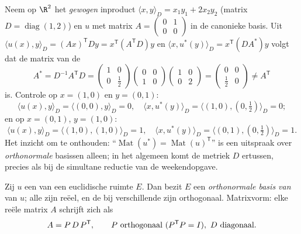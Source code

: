 \begin{example}\label{ex:b2:quadratic:weightedadjoint}
Neem op $\R^2$ het \emph{gewogen} inproduct $\langle x, y\rangle_D
= x_1y_1 + 2x_2y_2$ (matrix $D = \operatorname{diag}(1,2)$) en $u$
met matrix $A = \begin{pmatrix} 0 & 1\\ 0 & 0\end{pmatrix}$ in de
canonieke basis. Uit $\langle u(x), y\rangle_D = (Ax)^{\mathsf T}Dy
= x^{\mathsf T}(A^{\mathsf T}D)y$ en $\langle x, u^*(y)\rangle_D =
x^{\mathsf T}(DA^*)y$ volgt dat de matrix van de 
\[
A^* = D^{-1}A^{\mathsf T}D
= \begin{pmatrix} 1 & 0\\ 0 & \tfrac12\end{pmatrix}
\begin{pmatrix} 0 & 0\\ 1 & 0\end{pmatrix}
\begin{pmatrix} 1 & 0\\ 0 & 2\end{pmatrix}
= \begin{pmatrix} 0 & 0\\ \tfrac12 & 0\end{pmatrix}
\neq A^{\mathsf T}
\]
is. Controle op $x = (1,0)$ en $y = (0,1)$:
\[
\langle u(x), y\rangle_D = \langle (0,0), y\rangle_D = 0,
\quad
\langle x, u^*(y)\rangle_D
= \langle(1,0), (0,\tfrac12)\rangle_D = 0 ;
\]
en op $x = (0,1)$, $y = (1,0)$:
\[
\langle u(x), y\rangle_D = \langle(1,0),(1,0)\rangle_D = 1,
\quad
\langle x, u^*(y)\rangle_D =
\langle(0,1),(0,\tfrac12)\rangle_D = 1 .
\] Het inzicht om te onthouden:
``$\operatorname{Mat}(u^*) = \operatorname{Mat}(u)^{\mathsf T}$''
is een uitspraak over \emph{orthonormale} basissen alleen; in het
algemeen komt de metriek $D$ ertussen, precies als bij de simultane
reductie van de weekendopgave.
\end{example}

\begin{theorem}[Spectraalstelling]\label{thm:b2:quadratic:spectral}
Zij $u$ een  van een euclidische ruimte
$E$. Dan bezit $E$ een \emph{orthonormale basis van }
van $u$; alle  zijn reëel, en de  bij
verschillende  zijn orthogonaal. Matrixvorm: elke
reële  matrix $A$ schrijft zich als
\[
A = P\,D\,P^{\mathsf T},
\qquad P \text{ orthogonaal } (P^{\mathsf T} P = I),\ D
\text{ diagonaal}.\index{spectraalstelling}
\]
\end{theorem}

